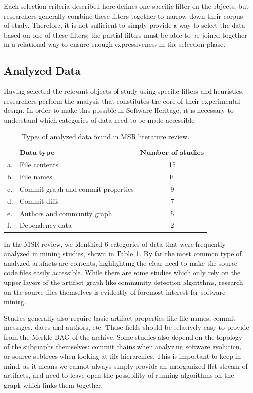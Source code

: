 Each selection criteria described here defines one specific filter on the
objects, but researchers generally combine these filters together to narrow
down their corpus of study. Therefore, it is not sufficient to simply provide a
way to select the data based on one of these filters; the partial filters must
be able to be joined together in a relational way to ensure enough
expressiveness in the selection phase.

\subsection{Analyzed Data}

Having selected the relevant objects of study using specific filters and
heuristics, researchers perform the analysis that constitutes the core
of their experimental design. In order to make this possible in Software
Heritage, it is necessary to understand which categories of data need to be
made accessible.

\begin{table}
    \begin{tabular}{l l c}
        & \textbf{Data type} & \textbf{Number of studies} \\
         a. & File contents & 15 \\
         b. & File names & 10 \\
         c. & Commit graph and commit properties & 9 \\
         d. & Commit diffs & 7 \\
         e. & Authors and community graph & 5 \\
         f. & Dependency data & 2 \\
    \end{tabular}
    \centering
    \caption{Types of analyzed data found in MSR literature review.}%
    \label{tab:analyzed-data}
\end{table}

In the MSR review, we identified 6 categories of data that were
frequently analyzed in mining studies, shown in Table~\ref{tab:analyzed-data}.
By far the most common type of analyzed artifacts are contents, highlighting the
clear need to make the source code files easily accessible. While there are
some studies which only rely on the upper layers of the artifact graph like
community detection algorithms, research on the source files themselves is
evidently of foremost interest for software mining.

Studies generally also require basic artifact properties like file names,
commit messages, dates and authors, etc. Those fields should be relatively easy
to provide from the Merkle DAG of the archive. Some studies also depend on the
topology of the subgraphs themselves: commit chains when analyzing software
evolution, or source subtrees when looking at file hierarchies. This is
important to keep in mind, as it means we cannot always simply provide an
unorganized flat stream of artifacts, and need to leave open the possibility of
running algorithms on the graph which links them together.

